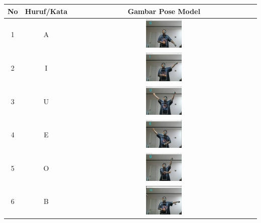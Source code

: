 		\begin{table}[h]
			\centering
			\label{tbl:Tabel Contoh Huruf/Kata dan Gambar Pose Model CNN Xception Orang Kedua}
			\begin{tabular}{|c|c|c|}
			\hline
			No & Huruf/Kata & Gambar Pose Model  \\
			\hline
			1 & A & \includegraphics[width=0.2\textwidth]{gambar/bener/HurufA_ModelCNNXception_Fachry.png} \\
			\hline
			2 & I & \includegraphics[width=0.2\textwidth]{gambar/bener/HurufI_ModelCNNXception_Fachry.png} \\
			\hline
			3 & U & \includegraphics[width=0.2\textwidth]{gambar/bener/HurufU_ModelCNNXception_Fachry.png} \\
			\hline
			4 & E & \includegraphics[width=0.2\textwidth]{gambar/bener/HurufE_ModelCNNXception_Fachry.png} \\
			\hline
			5 & O & \includegraphics[width=0.2\textwidth]{gambar/bener/HurufO_ModelXception_Fachry.png} \\
			\hline
			6 & B & \includegraphics[width=0.2\textwidth]{gambar/bener/HurufB_ModelCNNXception_Fachry.png} \\

\end{tabular}
\end{table}
